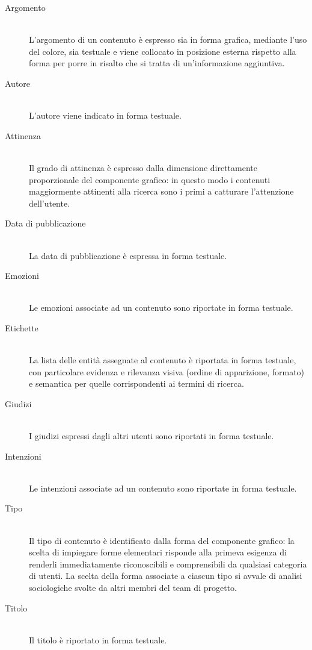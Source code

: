 \begin{description}
\item[Argomento] \hfill \\
L'argomento di un contenuto è espresso sia in forma grafica, mediante l'uso del colore, sia testuale e viene collocato in posizione esterna rispetto alla forma per porre in risalto che si tratta di un'informazione aggiuntiva.
\item[Autore] \hfill \\
L'autore viene indicato in forma testuale.
\item[Attinenza] \hfill \\
Il grado di attinenza è espresso dalla dimensione direttamente proporzionale del componente grafico: in questo modo i contenuti maggiormente attinenti alla ricerca sono i primi a catturare l'attenzione dell'utente.
\item[Data di pubblicazione] \hfill \\
La data di pubblicazione è espressa in forma testuale.
\item[Emozioni] \hfill \\
Le emozioni associate ad un contenuto sono riportate in forma testuale.
\item[Etichette] \hfill \\
La lista delle entità assegnate al contenuto è riportata in forma testuale, con particolare evidenza e rilevanza visiva (ordine di apparizione, formato) e semantica per quelle corrispondenti ai termini di ricerca.
\item[Giudizi] \hfill \\
I giudizi espressi dagli altri utenti sono riportati in forma testuale.
\item[Intenzioni] \hfill \\
Le intenzioni associate ad un contenuto sono riportate in forma testuale.
\item[Tipo] \hfill \\
Il tipo di contenuto è identificato dalla forma del componente grafico: la scelta di impiegare forme elementari risponde alla primeva esigenza di renderli immediatamente riconoscibili e comprensibili da qualsiasi categoria di utenti. La scelta della forma associate a ciascun tipo si avvale di analisi sociologiche svolte da altri membri del team di progetto.
\item[Titolo] \hfill \\
Il titolo è riportato in forma testuale.
\end{description}

